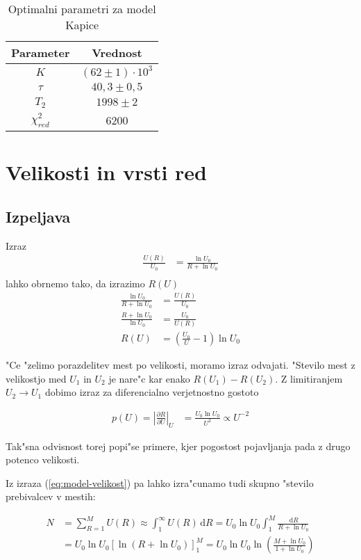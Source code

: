 \documentclass[a4paper,10pt]{article}
\newcommand{\dd}{\ensuremath{\, \mathrm{d}}}
\begin{document}
\begin{table}[h]
 \centering
\begin{tabular}{|c|c|}
 \hline
Parameter & Vrednost \\
\hline
$K$ & $(62 \pm 1) \cdot 10^3$  \\
$\tau$ & $40,3 \pm 0,5$ \\
$T_2$ & $1998 \pm 2$ \\
\hline
$\chi^2_{red}$ & 6200 \\
\hline
\end{tabular}
\caption{Optimalni parametri za model Kapice}
\label{tab:parametri-kapica}
\end{table}

\section{Velikosti in vrsti red}

\subsection{Izpeljava}
Izraz
\begin{align}
 \frac{U(R)}{U_0} &= \frac{\ln U_0}{R + \ln U_0} \label{eq:model-velikost} \\
\end{align}
lahko obrnemo tako, da izrazimo $R(U)$
\begin{align}
 \frac{\ln U_0}{R + \ln U_0} &= \frac{U(R)}{U_0} \\
 \frac{R + \ln U_0}{\ln U_0} &= \frac{U_0}{U(R)} \\
 R(U) &= \left(\frac{U_0}{U} - 1\right) \ln U_0
\end{align}

"Ce "zelimo porazdelitev mest po velikosti, moramo izraz odvajati. "Stevilo mest z velikostjo med $U_1$ in $U_2$ je nare"c kar enako $R(U_1) - R(U_2)$. Z limitiranjem $U_2\to U_1$ dobimo izraz za diferencialno verjetnostno gostoto

\begin{align}
 p(U) = \left|\frac{\partial R}{\partial U}\right|_U &= \frac{U_0 \ln U_0}{U^2} \propto U^{-2} \label{eq:distrib}
\end{align}

Tak"sna odvisnost torej popi"se primere, kjer pogostost pojavljanja pada z drugo potenco velikosti. 

Iz izraza (\ref{eq:model-velikost}) pa lahko izra"cunamo tudi skupno "stevilo prebivalcev v mestih:

\begin{align}
 N &= \sum_{R=1}^M U(R) \approx \int_1^\infty U(R) \dd R = U_0\ln U_0 \int_1^M \frac{\dd R}{R+\ln U_0}\\
   &=  U_0 \ln U_0 \left[ \ln (R+\ln U_0)\right]_1^M = U_0 \ln U_0 \ln \left(\frac{M + \ln U_0}{1 + \ln U_0}\right)
\end{align}
\end{document}
